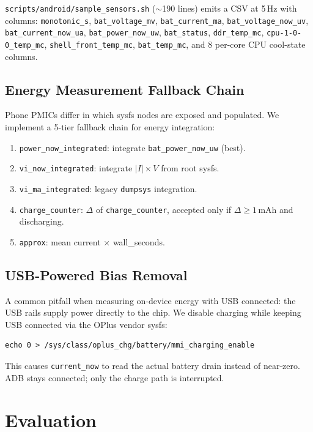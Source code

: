 \documentclass[sigconf, anonymous=false, screen=true]{acmart}
\begin{document}
\texttt{scripts/android/sample\_sensors.sh} ($\sim$190 lines) emits a CSV at 5\,Hz with columns: \texttt{monotonic\_s}, \texttt{bat\_voltage\_mv}, \texttt{bat\_current\_ma}, \texttt{bat\_voltage\_now\_uv}, \texttt{bat\_current\_now\_ua}, \texttt{bat\_power\_now\_uw}, \texttt{bat\_status}, \texttt{ddr\_temp\_mc}, \texttt{cpu-1-0-0\_temp\_mc}, \texttt{shell\_front\_temp\_mc}, \texttt{bat\_temp\_mc}, and 8 per-core CPU cool-state columns.

\subsection{Energy Measurement Fallback Chain}

Phone PMICs differ in which sysfs nodes are exposed and populated. We implement a 5-tier fallback chain for energy integration:

\begin{enumerate}
\item \texttt{power\_now\_integrated}: integrate \texttt{bat\_power\_now\_uw} (best).
\item \texttt{vi\_now\_integrated}: integrate $|I| \times V$ from root sysfs.
\item \texttt{vi\_ma\_integrated}: legacy \texttt{dumpsys} integration.
\item \texttt{charge\_counter}: $\Delta$ of \texttt{charge\_counter}, accepted only if $\Delta \ge 1$\,mAh and discharging.
\item \texttt{approx}: mean current $\times$ wall\_seconds.
\end{enumerate}

\subsection{USB-Powered Bias Removal}

A common pitfall when measuring on-device energy with USB connected: the USB rails supply power directly to the chip. We disable charging while keeping USB connected via the OPlus vendor sysfs:
\begin{lstlisting}[basicstyle=\ttfamily\footnotesize]
echo 0 > /sys/class/oplus_chg/battery/mmi_charging_enable
\end{lstlisting}
This causes \texttt{current\_now} to read the actual battery drain instead of near-zero. ADB stays connected; only the charge path is interrupted.

\section{Evaluation}
\label{sec:eval}
\end{document}
